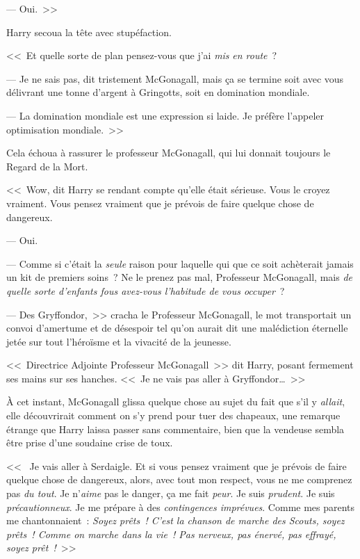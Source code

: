 --- Oui.~>>

Harry secoua la tête avec stupéfaction.

<<~Et quelle sorte de plan pensez-vous que j'ai \emph{mis} \emph{en route}~?

--- Je ne sais pas, dit tristement McGonagall, mais ça se termine soit avec vous délivrant une tonne d'argent à Gringotts, soit en domination mondiale.

--- La domination mondiale est une expression si laide. Je préfère l'appeler optimisation mondiale.~>>

Cela échoua à rassurer le professeur McGonagall, qui lui donnait toujours le Regard de la Mort.

<<~Wow, dit Harry se rendant compte qu'elle était sérieuse. Vous le croyez vraiment. Vous pensez vraiment que je prévois de faire quelque chose de dangereux.

--- Oui.

--- Comme si c'était la \emph{seule} raison pour laquelle qui que ce soit achèterait jamais un kit de premiers soins~? Ne le prenez pas mal, Professeur McGonagall, mais \emph{de quelle sorte d'enfants fous avez-vous l'habitude de vous occuper}~?

--- Des Gryffondor,~>> cracha le Professeur McGonagall, le mot transportait un convoi d'amertume et de désespoir tel qu'on aurait dit une malédiction éternelle jetée sur tout l'héroïsme et la vivacité de la jeunesse.

<<~Directrice Adjointe Professeur McGonagall~>> dit Harry, posant fermement ses mains sur ses hanches. <<~Je ne vais pas aller à Gryffondor…~>>

À cet instant, McGonagall glissa quelque chose au sujet du fait que s'il y \emph{allait}, elle découvrirait comment on s'y prend pour tuer des chapeaux, une remarque étrange que Harry laissa passer sans commentaire, bien que la vendeuse sembla être prise d'une soudaine crise de toux.

<<~ Je vais aller à Serdaigle. Et si vous pensez vraiment que je prévois de faire quelque chose de dangereux, alors, avec tout mon respect, vous ne me comprenez pas \emph{du tout}. Je n'\emph{aime} pas le danger, ça me fait \emph{peur}. Je suis \emph{prudent}. Je suis \emph{précautionneux}. Je me prépare à des \emph{contingences imprévues}. Comme mes parents me chantonnaient~: \emph{Soyez prêts~! C'est la chanson de marche des Scouts, soyez prêts~! Comme on marche dans la vie~! Pas nerveux, pas énervé, pas effrayé, soyez prêt~!}~>>

